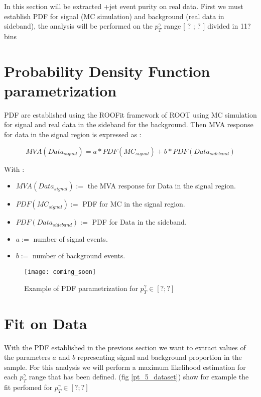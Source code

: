 \label{sec:unchapitre}

In this section will be extracted \textgamma+jet event purity on real data.
First we must establish PDF for signal (MC simulation) and background (real data in sideband), the analysis will be
performed on the $p_T^\gamma$ range [ ? ; ? ] divided in 11? bins

\section{Probability Density Function parametrization}

PDF are established using the ROOFit framework of ROOT using MC simulation for signal and real data in the sideband for the background.
Then MVA response for data in the signal region is expressed as : 

\begin{equation}
MVA(Data_{signal}) = a*PDF(MC_{signal}) + b*PDF(Data_{sideband})
\end{equation}

With : 
\begin{itemize}
	\item $MVA(Data_{signal}) :=$ the MVA response for Data in the signal region.
	\item $PDF(MC_{signal}) :=$ PDF for MC in the signal region.
	\item $PDF(Data_{sideband}) :=$ PDF for Data in the sideband. 
	\item $a :=$ number of signal events.
	\item $b :=$ number of background events. 
\end{itemize}

\begin{figure}[h!]
\centering
    \texttt{[image: coming\_soon]}
    \caption{Example of PDF parametrization for $p_T^\gamma \in [ ?;? ]$}
    \label{coming_soon}
\end{figure}

\section{Fit on Data}

With the PDF established in the previous section we want to extract values of the parameters $a$ and $b$ representing
signal and background proportion in the sample. For this analysis we will perform a maximum likelihood estimation for
each $p_T^\gamma$ range that has been defined. (fig \ref{pt_5_dataset}) show for example the fit perfomed for $p_T^\gamma \in [?;?]$

